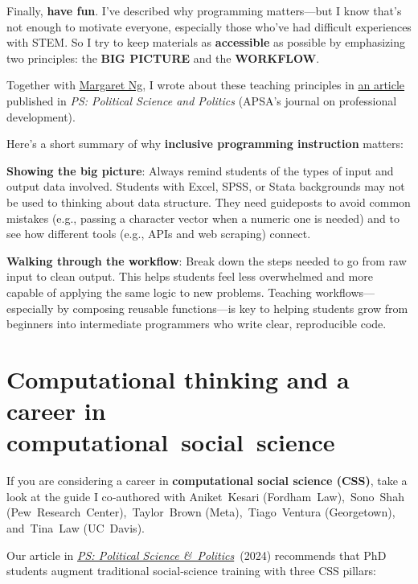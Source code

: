 \documentclass[
]{book}
\begin{document}
Finally, \textbf{have fun}. I've described why programming matters---but I know that's not enough to motivate everyone, especially those who've had difficult experiences with STEM. So I try to keep materials as \textbf{accessible} as possible by emphasizing two principles: the \textbf{BIG PICTURE} and the \textbf{WORKFLOW}.

Together with \href{https://media.illinois.edu/margaret-yee-man-ng}{Margaret Ng}, I wrote about these teaching principles in \href{https://osf.io/preprints/socarxiv/pf7n6/?fbclid=IwAR2ZI0yw_pehS0mxAmeUBOGpzIhiO2LMUPGBzBLTLNo4C2HrJSoH9uZhgTY}{an article} published in \emph{PS: Political Science and Politics} (APSA's journal on professional development).

Here's a short summary of why \textbf{inclusive programming instruction} matters:

\textbf{Showing the big picture}: Always remind students of the types of input and output data involved. Students with Excel, SPSS, or Stata backgrounds may not be used to thinking about data structure. They need guideposts to avoid common mistakes (e.g., passing a character vector when a numeric one is needed) and to see how different tools (e.g., APIs and web scraping) connect.

\textbf{Walking through the workflow}: Break down the steps needed to go from raw input to clean output. This helps students feel less overwhelmed and more capable of applying the same logic to new problems. Teaching workflows---especially by composing reusable functions---is key to helping students grow from beginners into intermediate programmers who write clear, reproducible code.

\section{Computational thinking and a career in computational~social~science}\label{computational-thinking-and-a-career-in-computational-social-science}

If you are considering a career in \textbf{computational social science (CSS)}, take a look at the guide I co‑authored with Aniket~Kesari (Fordham~Law),~Sono~Shah (Pew~Research~Center),~Taylor~Brown (Meta),~Tiago~Ventura (Georgetown), and~Tina~Law (UC~Davis).

Our article in \href{https://www.cambridge.org/core/journals/ps-political-science-and-politics/article/training-computational-social-science-phd-students-for-academic-and-nonacademic-careers/1455690939833B9FFCAC664D4E412057?utm_source=hootsuite&utm_medium=twitter&utm_campaign=PSC_Sep23\#article}{\emph{PS: Political Science \&~Politics}}~(2024) recommends that PhD students augment traditional social‑science training with three CSS pillars:
\end{document}
